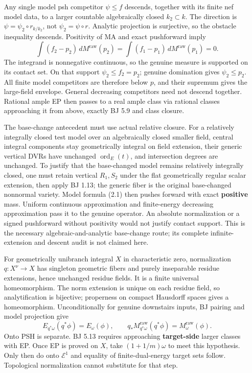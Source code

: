 \documentclass[
  10pt,
]{article}
\begin{document}
Any single model psh competitor \(\psi\le f\) descends, together with
its finite nef model data, to a larger countable algebraically closed
\(k_2\subset k\). The direction is \(\psi=\psi_2\circ r_{k/k_2}\), not
\(\psi_2=\psi\circ r\). Analytic projection is surjective, so the
obstacle inequality descends. Positivity of MA and exact pushforward
imply \[\int(f_2-p_2)\,dM^{\mathrm{raw}}(p_2)
 =\int(f_1-p_1)\,dM^{\mathrm{raw}}(p_1)=0.\] The integrand is
nonnegative continuous, so the genuine measure is supported on its
contact set. On that support \(\psi_2\le f_2=p_2\); genuine domination
gives \(\psi_2\le p_2\). All finite model competitors are therefore
below \(p\), and their supremum gives the large-field envelope. General
decreasing competitors need not descend together. Rational ample EP then
passes to a real ample class via rational classes approaching it from
above, exactly BJ 5.9 and class closure.

The base-change antecedent must use actual relative closure. For a
relatively integrally closed test model over an algebraically closed
smaller field, central integral components stay geometrically integral
on field extension, their generic vertical DVRs have unchanged
\(\operatorname{ord}_E(t)\), and intersection degrees are unchanged. To
justify that the base-changed model remains relatively integrally
closed, one must retain vertical \(R_1,S_2\) under the flat
geometrically regular scalar extension, then apply BJ 1.13; the generic
fiber is the original base-changed nonnormal variety. Model formula
(2.1) then pushes forward with exact \textbf{positive} mass. Uniform
continuous approximation and finite-energy decreasing approximation pass
it to the genuine operator. An absolute normalization or a signed
pushforward without positivity would not justify contact support. This
is the necessary algebraic-and-analytic base-change route; its complete
infinite-extension and descent audit is not claimed here.

For geometrically unibranch integral \(X\) in characteristic zero,
normalization \(q:X^\nu\to X\) has singleton geometric fibers and purely
inseparable residue extensions, hence unchanged residue fields. It is a
finite universal homeomorphism. The norm extension is unique on each
residue field, so analytification is bijective; properness on compact
Hausdorff spaces gives a homeomorphism. Unconditionally for genuine
downstairs inputs, BJ pairing and model projection give
\[E_{q^*\omega}(q^*\phi)=E_\omega(\phi),\qquad
 q_*M^{\mathrm{raw}}_{q^*\omega}(q^*\phi)=M^{\mathrm{raw}}_\omega(\phi). \tag{8.1}\]
Onto PSH is separate. BJ 5.13 requires approaching \textbf{target-side}
larger classes with EP. Once EP is proved on \(X\), take
\((1+1/m)\omega\) to meet this hypothesis. Only then do onto
\(\mathcal E^1\) and equality of finite-dual-energy target sets follow.
Topological normalization cannot substitute for that step.
\end{document}
